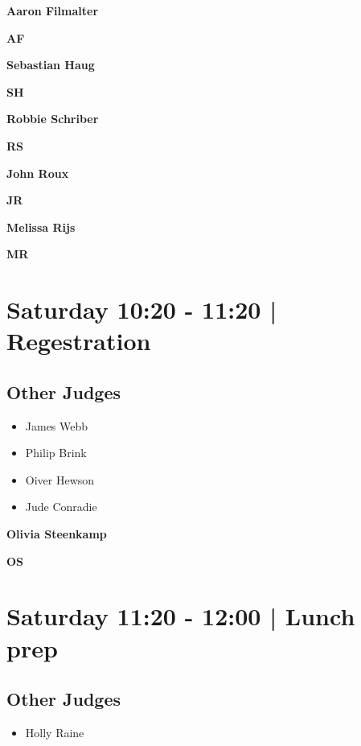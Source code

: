 \documentclass[10pt]{article}
\newcommand{\newtitle}[1]{\begin{center}{\Huge\bfseries #1 }\\ \vspace{5mm}\end{center}}
\newcommand{\newsubtitle}[1]{\begin{center}{\color{grey}\Large\bfseries #1 }\\ \vspace{5mm}\end{center}}
\begin{document}
    
	\clearpage

		\newtitle{Aaron Filmalter}
	\newsubtitle{AF}

    
	\clearpage

		\newtitle{Sebastian Haug}
	\newsubtitle{SH}

    
	\clearpage

		\newtitle{Robbie Schriber}
	\newsubtitle{RS}

    
	\clearpage

		\newtitle{John Roux}
	\newsubtitle{JR}

    
	\clearpage

		\newtitle{Melissa Rijs}
	\newsubtitle{MR}

            \section*{Saturday 10:20
        -
        11:20
        |
         Regestration}
        
                
        \subsection*{Other Judges}
        
            \begin{itemize}
                            \item James Webb
                            \item Philip Brink
                            \item Oiver Hewson
                            \item Jude Conradie
                        \end{itemize}
        

    
	\clearpage

		\newtitle{Olivia Steenkamp}
	\newsubtitle{OS}

            \section*{Saturday 11:20
        -
        12:00
        |
         Lunch prep}
        
                
        \subsection*{Other Judges}
        
            \begin{itemize}
                            \item Holly Raine
                        \end{itemize}
        
\end{document}
